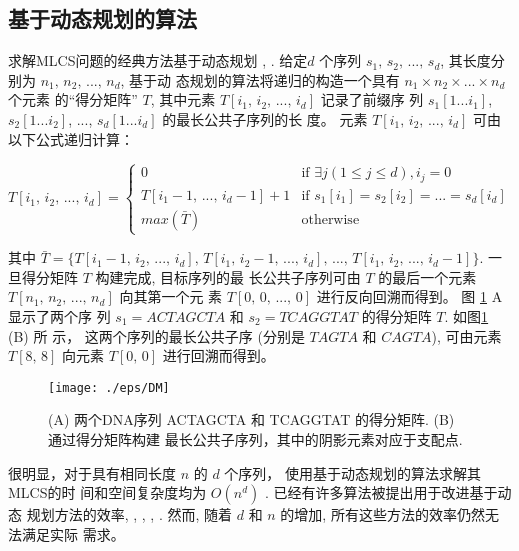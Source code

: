 \documentclass[utf8]{frontiersSCNS} %
\begin{document}
\subsection{基于动态规划的算法}
\label {sec:Dynamic Programming}

求解MLCS问题的经典方法基于动态规划 \cite{Smith1981}, \cite{Sankoff1972}. 给定$d$
个序列 $s_1,\, s_2,\,...,\, s_d$, 其长度分别为 $n_1,\, n_2,\, ...,\, n_d$, 基于动
态规划的算法将递归的构造一个具有 $n_1 \times n_2 \times ... \times n_d$ 个元素
的“得分矩阵” $T$, 其中元素 $T[i_1,\, i_2,\, ...,\, i_d]$ 记录了前缀序
列 $s_1[1...i_1]$, $s_2[1...i_2]$, ..., $s_d[1...i_d]$ 的最长公共子序列的长
度。 元素 $T[i_1,\, i_2,\, ...,\, i_d]$ 可由以下公式递归计算：

\begin{equation}
  T[i_1,\, i_2,\, ...,\, i_d] =
  \begin{cases}
    0 & \text{if $\exists j(1 \leq j \leq d), i_j = 0$}\\
    T[i_1-1,\, ...,\, i_d-1] + 1  & \text{if $s_1[i_1] = s_2[i_2] =
      ... = s_d[i_d]$}\\
    max(\bar{T}) & \text{otherwise}
  \end{cases}
\end{equation}

其中
$\bar{T} = \{T[i_1-1,\, i_2,\, ...,\, i_d],\, T[i_1,\, i_2-1,\, ...,\, i_d],\,
...,\, T[i_1,\, i_2,\, ...,\, i_d-1]\}$. 一旦得分矩阵 $T$ 构建完成, 目标序列的最
长公共子序列可由 $T$ 的最后一个元素 $T[n_1,\, n_2,\, ...,\, n_d]$ 向其第一个元
素 $T[0,\, 0,\, ...,\, 0]$ 进行反向回溯而得到。 图 \ref{fig:DM} A 显示了两个序
列 $s_1 = ACTAGCTA$ 和 $s_2 = TCAGGTAT$ 的得分矩阵 $T$. 如图\ref{fig:DM} (B) 所
示， 这两个序列的最长公共子序 (分别是 $TAGTA$ 和 $CAGTA$), 可由元素 $T[8,\, 8]$
向元素 $T[0,\, 0]$ 进行回溯而得到。

\begin{figure}[!h]
  \centering
  \texttt{[image: ./eps/DM]}
  \caption{(A) 两个DNA序列 ACTAGCTA 和 TCAGGTAT 的得分矩阵. (B) 通过得分矩阵构建
    最长公共子序列，其中的阴影元素对应于支配点.}
\label{fig:DM}
\end{figure}

很明显，对于具有相同长度 $n$ 的 $d$ 个序列， 使用基于动态规划的算法求解其MLCS的时
间和空间复杂度均为 $O(n^d)$ \cite{Hsu1984}. 已经有许多算法被提出用于改进基于动态
规划方法的效率, \cite{Hirschberg1977}, \cite{Apostolico1992}, \cite{Masek1980},
\cite{Rick1994}. 然而, 随着 $d$ 和 $n$ 的增加, 所有这些方法的效率仍然无法满足实际
需求。
\end{document}
